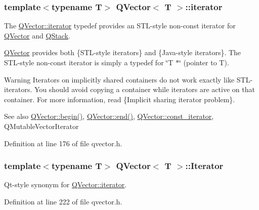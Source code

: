 \subsubsection[{\texorpdfstring{iterator}{iterator}}]{\setlength{\rightskip}{0pt plus 5cm}template$<$typename T$>$ {\bf Q\+Vector}$<$ T $>$\+::{\bf iterator}}\hypertarget{class_q_vector_af6ac26e0dfede6e3045be0c947201267}{}\label{class_q_vector_af6ac26e0dfede6e3045be0c947201267}
The \hyperlink{class_q_vector_af6ac26e0dfede6e3045be0c947201267}{Q\+Vector\+::iterator} typedef provides an S\+T\+L-\/style non-\/const iterator for \hyperlink{class_q_vector}{Q\+Vector} and \hyperlink{class_q_stack}{Q\+Stack}.

\hyperlink{class_q_vector}{Q\+Vector} provides both \{S\+T\+L-\/style iterators\} and \{Java-\/style iterators\}. The S\+T\+L-\/style non-\/const iterator is simply a typedef for \char`\"{}\+T $\ast$\char`\"{} (pointer to T).

\begin{DoxyWarning}{Warning}
Iterators on implicitly shared containers do not work exactly like S\+T\+L-\/iterators. You should avoid copying a container while iterators are active on that container. For more information, read \{Implicit sharing iterator problem\}.
\end{DoxyWarning}
\begin{DoxySeeAlso}{See also}
\hyperlink{class_q_vector_ad0c2c0e80b789c3a78a8c3a32dba31cc}{Q\+Vector\+::begin()}, \hyperlink{class_q_vector_aee13fe5819dcac8aee22f40f31c2790b}{Q\+Vector\+::end()}, \hyperlink{class_q_vector_a01e19bfad7fefd3e97ef197f4ed2cceb}{Q\+Vector\+::const\+\_\+iterator}, Q\+Mutable\+Vector\+Iterator 
\end{DoxySeeAlso}


Definition at line 176 of file qvector.\+h.

\subsubsection[{\texorpdfstring{Iterator}{Iterator}}]{\setlength{\rightskip}{0pt plus 5cm}template$<$typename T$>$ {\bf Q\+Vector}$<$ T $>$\+::{\bf Iterator}}\hypertarget{class_q_vector_a22a5801860ee27fedc7dca5062355089}{}\label{class_q_vector_a22a5801860ee27fedc7dca5062355089}
Qt-\/style synonym for \hyperlink{class_q_vector_af6ac26e0dfede6e3045be0c947201267}{Q\+Vector\+::iterator}. 

Definition at line 222 of file qvector.\+h.

